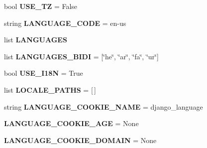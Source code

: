 \begin{DoxyCompactItemize}
bool {\bfseries U\+S\+E\+\_\+\+TZ} = False
\item 
\mbox{\label{namespacedjango_1_1conf_1_1global__settings_ad15e0ed22b04e85a6676671f44f952ac}} 
string {\bfseries L\+A\+N\+G\+U\+A\+G\+E\+\_\+\+C\+O\+DE} = \textquotesingle{}en-\/us\textquotesingle{}
\item 
\mbox{\label{namespacedjango_1_1conf_1_1global__settings_a481b01dcdab60a088cee8c7a0a8ff4da}} 
list {\bfseries L\+A\+N\+G\+U\+A\+G\+ES}
\item 
\mbox{\label{namespacedjango_1_1conf_1_1global__settings_a6708ce3fcb89f11c561c423155877c1b}} 
list {\bfseries L\+A\+N\+G\+U\+A\+G\+E\+S\+\_\+\+B\+I\+DI} = \mbox{[}\char`\"{}he\char`\"{}, \char`\"{}ar\char`\"{}, \char`\"{}fa\char`\"{}, \char`\"{}ur\char`\"{}\mbox{]}
\item 
\mbox{\label{namespacedjango_1_1conf_1_1global__settings_a51e00e45a8000a8baf3b4f96e2854325}} 
bool {\bfseries U\+S\+E\+\_\+\+I18N} = True
\item 
\mbox{\label{namespacedjango_1_1conf_1_1global__settings_a85d67f21bf79376090823af5953540e3}} 
list {\bfseries L\+O\+C\+A\+L\+E\+\_\+\+P\+A\+T\+HS} = \mbox{[}$\,$\mbox{]}
\item 
\mbox{\label{namespacedjango_1_1conf_1_1global__settings_a0a37f59ebe52bcd87a512cda49ca8d24}} 
string {\bfseries L\+A\+N\+G\+U\+A\+G\+E\+\_\+\+C\+O\+O\+K\+I\+E\+\_\+\+N\+A\+ME} = \textquotesingle{}django\+\_\+language\textquotesingle{}
\item 
\mbox{\label{namespacedjango_1_1conf_1_1global__settings_acd4f6718c9eb9667bf631395942b687c}} 
{\bfseries L\+A\+N\+G\+U\+A\+G\+E\+\_\+\+C\+O\+O\+K\+I\+E\+\_\+\+A\+GE} = None
\item 
\mbox{\label{namespacedjango_1_1conf_1_1global__settings_a3dd5d63e3e8864702698c3aef76d34bc}} 
{\bfseries L\+A\+N\+G\+U\+A\+G\+E\+\_\+\+C\+O\+O\+K\+I\+E\+\_\+\+D\+O\+M\+A\+IN} = None

\end{DoxyCompactItemize}
